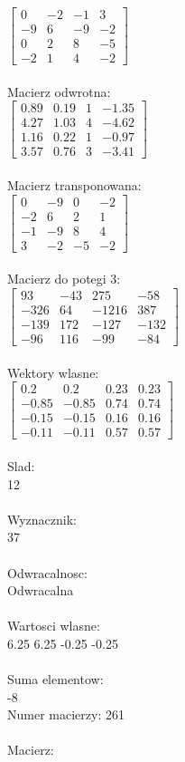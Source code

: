 \documentclass[a4paper,12pt]{article}
\begin{document}
$\begin{bmatrix} 0&-2&-1&3\\-9&6&-9&-2\\0&2&8&-5\\-2&1&4&-2 \end{bmatrix}$
\\
\\
Macierz odwrotna:\\

$\begin{bmatrix} 0.89&0.19&1&-1.35\\4.27&1.03&4&-4.62\\1.16&0.22&1&-0.97\\3.57&0.76&3&-3.41 \end{bmatrix}$
\\
\\
Macierz transponowana:\\

$\begin{bmatrix} 0&-9&0&-2\\-2&6&2&1\\-1&-9&8&4\\3&-2&-5&-2 \end{bmatrix}$
\\
\\
Macierz do potegi 3:\\

$\begin{bmatrix} 93&-43&275&-58\\-326&64&-1216&387\\-139&172&-127&-132\\-96&116&-99&-84 \end{bmatrix}$
\\
\\
Wektory wlasne:\\

$\begin{bmatrix} 0.2&0.2&0.23&0.23\\-0.85&-0.85&0.74&0.74\\-0.15&-0.15&0.16&0.16\\-0.11&-0.11&0.57&0.57 \end{bmatrix}$
\\
\\
Slad:\\
12
\\
\\
Wyznacznik:\\
37
\\
\\
Odwracalnosc:\\
Odwracalna
\\
\\
Wartosci wlasne:\\
6.25 6.25 -0.25 -0.25
\\
\\
Suma elementow:\\
-8
\\
\newpage
Numer macierzy:
261
\\
\\
Macierz:\\
\end{document}
